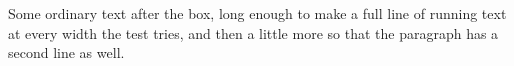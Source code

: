 \documentclass{article}
\begin{document}
\vbox{\hsize\textwidth
  \vskip -20pt
  \vskip 30pt
  }
\vskip 12pt
Some ordinary text after the box, long enough to make a full line of
running text at every width the test tries, and then a little more so that
the paragraph has a second line as well.
\end{document}

